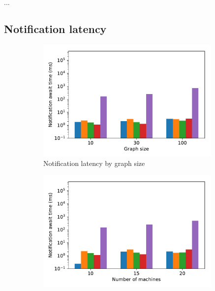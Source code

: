 ...

\subsection{Notification latency}
\begin{figure}[t!]
    \begin{subfigure}[b]{0.32\textwidth}
            \includegraphics[width=0.99\textwidth]{pics/notification_await_time_by_graph_size_bars.pdf}
            \caption{Notification latency by graph size}
            \label{notification_graph}
    \end{subfigure}
    \hspace{5mm}
    \begin{subfigure}[b]{0.32\textwidth}
            \includegraphics[width=0.99\textwidth]{pics/notification_await_time_by_number_of_machines_bars.pdf}

\end{subfigure}
\end{figure}
